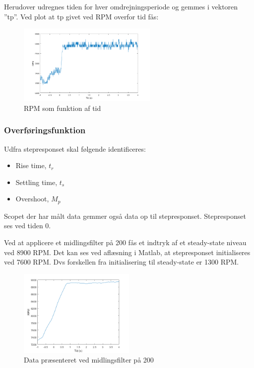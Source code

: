 Herudover udregnes tiden for hver omdrejningsperiode og gemmes i vektoren ”tp”. Ved plot at tp givet ved RPM overfor tid fås:

\begin{figure}[h]
  \centering
  \includegraphics[width=0.6\textwidth]{./figurer/mo3.png}
  \caption{RPM som funktion af tid}
  \label{fig:mo3}
\end{figure}

\subsubsection{Overføringsfunktion}

\label{sec:overforingsfunktion}
Udfra stepresponset skal følgende identificeres:

\begin{itemize}
\item Rise time, $t_r$
\item Settling time, $t_s$
\item Overshoot, $M_p$
\end{itemize}

Scopet der har målt data gemmer også data op til stepresponset. Stepresponset ses ved tiden 0.

Ved at applicere et midlingsfilter på 200 fås et indtryk af et steady-state niveau ved 8900 RPM. Det kan ses ved aflæsning i Matlab, at stepresponset initialiseres ved 7600 RPM. Dvs forskellen fra initialisering til steady-state er 1300 RPM. 

\begin{figure}[h]
  \centering
  \includegraphics[width=0.5\textwidth]{./figurer/mo4.png}
  \caption{Data præsenteret ved midlingsfilter på 200}
  \label{fig:mo4}
\end{figure}

